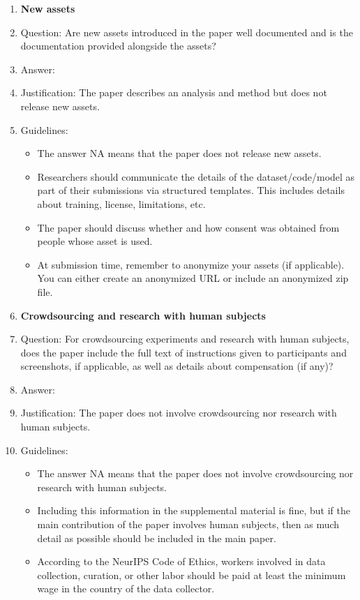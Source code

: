 \documentclass{article}
\begin{document}
\begin{enumerate}
\item {\bf New assets}
    \item[] Question: Are new assets introduced in the paper well documented and is the documentation provided alongside the assets?
    \item[] Answer: \answerNA{}{} %
    \item[] Justification: The paper describes an analysis and method but does not release new assets.
    \item[] Guidelines:
    \begin{itemize}
        \item The answer NA means that the paper does not release new assets.
        \item Researchers should communicate the details of the dataset/code/model as part of their submissions via structured templates. This includes details about training, license, limitations, etc. 
        \item The paper should discuss whether and how consent was obtained from people whose asset is used.
        \item At submission time, remember to anonymize your assets (if applicable). You can either create an anonymized URL or include an anonymized zip file.
    \end{itemize}

\item {\bf Crowdsourcing and research with human subjects}
    \item[] Question: For crowdsourcing experiments and research with human subjects, does the paper include the full text of instructions given to participants and screenshots, if applicable, as well as details about compensation (if any)? 
    \item[] Answer: \answerNA{}{} %
    \item[] Justification: The paper does not involve crowdsourcing nor research with human subjects.
    \item[] Guidelines:
    \begin{itemize}
        \item The answer NA means that the paper does not involve crowdsourcing nor research with human subjects.
        \item Including this information in the supplemental material is fine, but if the main contribution of the paper involves human subjects, then as much detail as possible should be included in the main paper. 
        \item According to the NeurIPS Code of Ethics, workers involved in data collection, curation, or other labor should be paid at least the minimum wage in the country of the data collector. 
    \end{itemize}


\end{enumerate}
\end{document}

